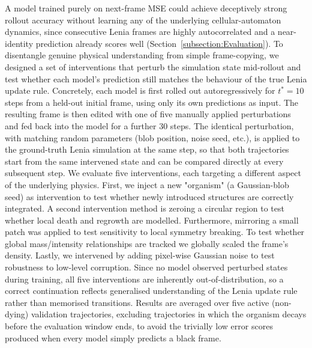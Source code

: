 A model trained purely on next-frame MSE could achieve deceptively strong rollout
accuracy without learning any of the underlying cellular-automaton dynamics, since
consecutive Lenia frames are highly autocorrelated and a near-identity prediction
already scores well (Section~\ref{subsection:Evaluation}). To disentangle genuine physical
understanding from simple frame-copying, we designed a set of interventions
that perturb the simulation state mid-rollout and test whether each model's
prediction still matches the behaviour of the true Lenia update rule. Concretely,
each model is first rolled out autoregressively for $t^{*}=10$ steps from a
held-out initial frame, using only its own predictions as input. The resulting
frame is then edited with one of five manually applied perturbations and fed back into
the model for a further 30 steps. The identical perturbation, with matching random
parameters (blob position, noise seed, etc.), is applied to the ground-truth Lenia
simulation at the same step, so that both trajectories start from the same
intervened state and can be compared directly at every subsequent step. We evaluate
five interventions, each targeting a different aspect of the underlying physics.
First, we inject a new "organism" (a Gaussian-blob seed) as intervention to test whether newly introduced
structures are correctly integrated. A second intervention method is zeroing a circular region to test whether
local death and regrowth are modelled. Furthermore, mirroring a small patch was applied to test sensitivity
to local symmetry breaking. To test whether global mass/intensity relationships are tracked we globally scaled the frame's density.
Lastly, we intervened by adding pixel-wise Gaussian noise to test robustness to low-level corruption. Since no model observed
perturbed states during training, all five interventions are inherently
out-of-distribution, so a correct continuation reflects generalised understanding
of the Lenia update rule rather than memorised transitions. Results are averaged
over five active (non-dying) validation trajectories, excluding trajectories in
which the organism decays before the evaluation window ends, to avoid the
trivially low error scores produced when every model simply predicts a black
frame.
